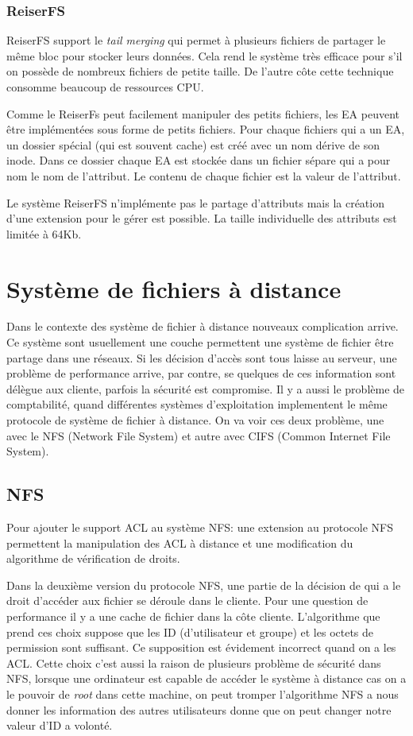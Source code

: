 \documentclass{article}
\begin{document}
\subsubsection{ReiserFS}

ReiserFS support le \emph{tail merging} qui permet à plusieurs fichiers de partager le même bloc pour stocker leurs données. Cela rend le système très efficace pour s'il on possède de nombreux fichiers de petite taille. De l'autre côte cette technique consomme beaucoup de ressources CPU. 
	
Comme le ReiserFs peut facilement manipuler des petits fichiers, les EA peuvent être implémentées sous forme de petits fichiers. Pour chaque fichiers qui a un EA, un dossier spécial (qui est souvent cache) est créé avec un nom dérive de son inode. Dans ce dossier chaque EA est stockée dans un fichier sépare qui a pour nom le nom de l'attribut. Le contenu de chaque fichier est la valeur de l'attribut.

Le système ReiserFS n'implémente pas le partage d'attributs mais la création d'une extension pour le gérer est possible. La taille individuelle des attributs est limitée à 64Kb.

\section{Système de fichiers à distance}
Dans le contexte des système de fichier à distance nouveaux complication arrive. Ce système sont usuellement une couche permettent  une système de fichier être partage dans une réseaux. Si les décision d'accès sont tous laisse au serveur, une problème de performance arrive, par contre, se quelques de ces information sont délègue aux cliente, parfois la sécurité est compromise. Il y a aussi le problème de comptabilité, quand différentes systèmes d'exploitation implementent le même protocole de système de fichier à distance. On va voir ces deux problème, une avec le NFS (Network File System) et autre avec CIFS (Common Internet File System). 

\subsection{NFS}
Pour ajouter le support ACL au système NFS: une extension au protocole NFS permettent la manipulation des ACL à distance et une modification du algorithme de vérification de droits.

Dans la deuxième version du protocole NFS, une partie de la décision de qui a le droit d'accéder aux fichier se déroule dans le cliente. Pour une question de performance il y a une cache de fichier dans la côte cliente. L'algorithme que prend ces choix suppose que les ID (d'utilisateur et groupe) et les octets de permission sont suffisant. Ce supposition est évidement incorrect quand on a les ACL. Cette choix c'est aussi la raison de plusieurs problème de sécurité dans NFS, lorsque une ordinateur est capable de accéder le système à distance cas on a le pouvoir de \emph{root} dans cette machine, on peut tromper l'algorithme NFS a nous donner les information des autres utilisateurs donne que on peut changer notre valeur d'ID a volonté.
\end{document}
